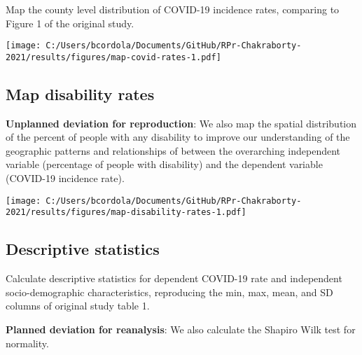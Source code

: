 \documentclass[
]{article}
\begin{document}
Map the county level distribution of COVID-19 incidence rates, comparing
to Figure 1 of the original study.

\texttt{[image: C:/Users/bcordola/Documents/GitHub/RPr-Chakraborty-2021/results/figures/map-covid-rates-1.pdf]}

\hypertarget{map-disability-rates}{%
\subsection{Map disability rates}\label{map-disability-rates}}

\textbf{Unplanned deviation for reproduction}: We also map the spatial
distribution of the percent of people with any disability to improve our
understanding of the geographic patterns and relationships of between
the overarching independent variable (percentage of people with
disability) and the dependent variable (COVID-19 incidence rate).

\texttt{[image: C:/Users/bcordola/Documents/GitHub/RPr-Chakraborty-2021/results/figures/map-disability-rates-1.pdf]}

\hypertarget{descriptive-statistics}{%
\subsection{Descriptive statistics}\label{descriptive-statistics}}

Calculate descriptive statistics for dependent COVID-19 rate and
independent socio-demographic characteristics, reproducing the min, max,
mean, and SD columns of original study table 1.

\textbf{Planned deviation for reanalysis}: We also calculate the Shapiro
Wilk test for normality.
\end{document}
